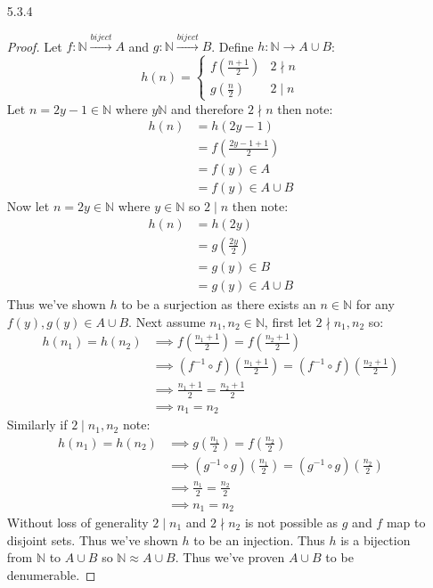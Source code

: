 \documentclass[11pt]{amsart}
\theoremstyle{definition}
\begin{document}
\begin{itemize}
\item[5.3.4] \begin{proof}
	Let $f:\mathbb{N}\xrightarrow{biject}A$ and $g:\mathbb{N}\xrightarrow{biject}B$. Define $h:\mathbb{N}\to A\cup B$:
	\begin{equation*}
		h(n)=\begin{cases}
			f(\frac{n+1}2) &2\nmid n\\
			g(\frac n2) &2\mid n
		\end{cases}
	\end{equation*}
	Let $n=2y-1\in\mathbb{N}$ where $y\mathbb{N}$ and therefore $2\nmid n$ then note:
	\begin{align*}
		h(n)&=h(2y-1) \\
			&=f(\frac{2y-1+1}2) \\
			&=f(y)\in A \\
			&=f(y)\in A\cup B
	\end{align*}
	Now let $n=2y\in\mathbb{N}$ where $y\in\mathbb{N}$ so $2\mid n$ then note:
	\begin{align*}
		h(n)&=h(2y)\\
			&=g(\frac{2y}2)\\
			&=g(y)\in B \\
			&=g(y)\in A\cup B
	\end{align*}
	Thus we've shown $h$ to be a surjection as there exists an $n\in\mathbb{N}$ for any $f(y),g(y)\in A\cup B$. Next assume $n_1,n_2\in\mathbb{N}$, first let $2\nmid n_1,n_2$ so:
	\begin{align*}
		h(n_1)=h(n_2)
		&\implies f(\frac{n_1+1}2)=f(\frac{n_2+1}2)\\			 
		&\implies(f^{-1}\circ f)(\frac{n_1+1}2)=(f^{-1}\circ f)(\frac{n_2+1}2) \\
		&\implies\frac{n_1+1}2=\frac{n_2+1}2\\
		&\implies n_1=n_2
	\end{align*}
	Similarly if $2\mid n_1,n_2$ note:
	\begin{align*}
		h(n_1)=h(n_2)
		&\implies g(\frac{n_1}2)=f(\frac{n_2}2)\\			 
		&\implies(g^{-1}\circ g)(\frac{n_1}2)=(g^{-1}\circ g)(\frac{n_2}2) \\
		&\implies\frac{n_1}2=\frac{n_2}2\\
		&\implies n_1=n_2
	\end{align*}
	Without loss of generality $2\mid n_1$ and $2\nmid n_2$ is not possible as $g$ and $f$ map to disjoint sets. Thus we've shown $h$ to be an injection. Thus $h$ is a bijection from $\mathbb{N}$ to $A\cup B$ so $\mathbb{N}\approx A\cup B$. Thus we've proven $A\cup B$ to be denumerable.
\end{proof}


\end{itemize}
\end{document}

